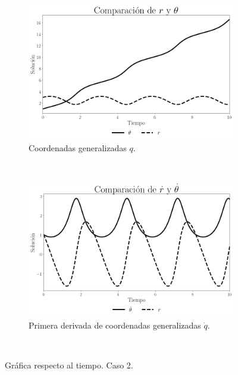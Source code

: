 \documentclass[12pt,letterpaper]{article}
\begin{document}

\begin{figure}
    \centering
    \begin{subfigure}[b]{0.8\textwidth}
        \includegraphics[width=\textwidth]{case04_r_theta}
        \caption{Coordenadas generalizadas $q$.}
        \label{fig:case 4 q lagrange}
    \end{subfigure}
    ~ %
    \begin{subfigure}[b]{0.8\textwidth}
        \includegraphics[width=\textwidth]{case04_d_r_d_theta}
        \caption{Primera derivada de coordenadas generalizadas $\dot q$.}
        \label{fig:case 4 dq lagrange}
    \end{subfigure}
    ~ %
    \caption{Gráfica respecto al tiempo. Caso 2.}\label{fig:case 4 time plot lagrange}
\end{figure}
\end{document}

